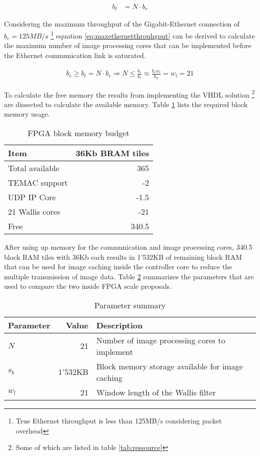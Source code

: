 \begin{align}
    b_t  & = N \cdot b_r
    \label{eq:scaledrealttotalhroughput}
\end{align}

Considering the maximum throughput of the Gigabit-Ethernet connection of
$b_e=125MB/s$ \footnote{True Ethernet throughput is less than 125MB/s
considering packet overhead} equation \ref{eq:maxethernetthrouhgput} can be derived to calculate the
maximum number of image processing cores that can be implemented before the
Ethernet communication link is saturated.

\begin{align}
    b_e \geq b_t = N \cdot b_r \Rightarrow N \leq \frac{b_e}{b_r} \approx 
    \frac{b_e w_l}{b_w} = w_l = 21
    \label{eq:maxethernetthrouhgput}
\end{align}

To calculate the free memory the results from implementing the VHDL solution
\footnote{Some of which are listed in table \ref{tab:ressource}} 
are dissected to calculate the available memory. Table \ref{tab:membudget}
lists the required block memory usage.

\begin{table}[h!]
    \centering
    \begin{tabular}{l r}
        \toprule
        Item & 36Kb BRAM tiles \footnotemark \\
        \midrule
        Total available & 365 \\
        TEMAC support & -2 \\
        UDP IP Core & -1.5 \\
        21 Wallis cores & -21 \\
        \midrule
        Free & 340.5\\
        \bottomrule
    \end{tabular}
    \caption{FPGA block memory budget}
    \label{tab:membudget}
\end{table}

After using up memory for the communication and image processing cores, 340.5
block RAM tiles with 36Kb each results in 1'532KB of remaining block RAM that
can be used for image caching inside the controller core to reduce the multiple
transmission of image data. Table \ref{tab:parsum} summarizes the
parameters that are used to compare the two inside FPGA scale proposals.

\begin{table}[h!]
    \centering
    \begin{tabular}{l r l}
        \toprule
        Parameter & Value & Description\\
        \midrule
        $N$ & 21 & Number of image processing cores to implement \\
        $s_b$ & 1'532KB & Block memory storage available for image caching \\
        $w_l$ & 21 & Window length of the Wallis filter \\
        \bottomrule
    \end{tabular}
    \caption{Parameter summary}
    \label{tab:parsum}
\end{table}

